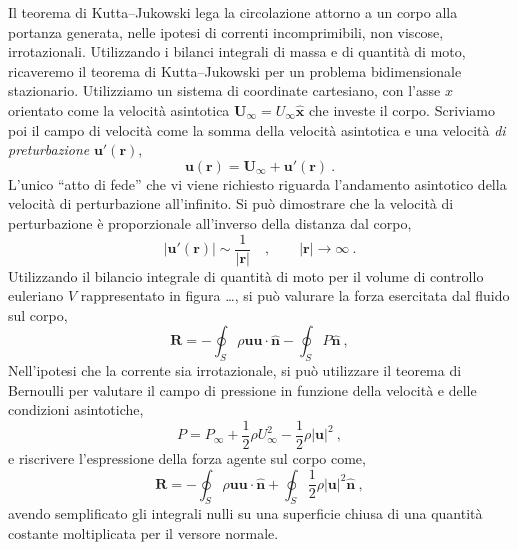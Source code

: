 
Il teorema di Kutta--Jukowski lega la circolazione attorno a un corpo alla portanza generata, nelle ipotesi di correnti incomprimibili, non viscose, irrotazionali.
Utilizzando i bilanci integrali di massa e di quantità di moto, ricaveremo il teorema di Kutta--Jukowski per un problema bidimensionale stazionario.
Utilizziamo un sistema di coordinate cartesiano, con l'asse $x$ orientato come la velocità asintotica $\bm{U}_{\infty} = U_{\infty} \bm{\hat{x}}$ che investe il corpo. Scriviamo poi il campo di velocità come la somma della velocità asintotica e una velocità \textit{di preturbazione} $\bm{u}'(\bm{r})$,
\begin{equation}\label{eqn:vel:dec}
 \bm{u}(\bm{r}) = \bm{U}_{\infty} + \bm{u}'(\bm{r}) \ .
\end{equation}
L'unico ``atto di fede'' che vi viene richiesto riguarda l'andamento asintotico della velocità di perturbazione all'infinito. Si può dimostrare che la velocità di perturbazione è proporzionale all'inverso della distanza dal corpo,
\begin{equation}
 |\bm{u}'(\bm{r})| \sim \dfrac{1}{|\bm{r}|} \quad, \qquad |\bm{r}| \rightarrow \infty \ .
\end{equation}
Utilizzando il bilancio integrale di quantità di moto per il volume di controllo euleriano $V$ rappresentato in figura {\color{red} \dots}, si può valurare la forza esercitata dal fluido sul corpo,
\begin{equation}
 \bm{R} = - \oint_S \rho \bm{u} \bm{u} \cdot \bm{\hat{n}} - \oint_S P \bm{\hat{n}} \ ,
\end{equation}
Nell'ipotesi che la corrente sia irrotazionale, si può utilizzare il teorema di Bernoulli per valutare il campo di pressione in funzione della velocità e delle condizioni asintotiche,
\begin{equation}
 P = P_{\infty} + \dfrac{1}{2} \rho U_{\infty}^2 - \dfrac{1}{2} \rho |\bm{u}|^2 \ ,
\end{equation}
e riscrivere l'espressione della forza agente sul corpo come,
\begin{equation}
 \bm{R} = - \oint_S \rho \bm{u} \bm{u} \cdot \bm{\hat{n}} + \oint_S \dfrac{1}{2} \rho |\bm{u}|^2 \bm{\hat{n}} \ ,
\end{equation}
avendo semplificato gli integrali nulli su una superficie chiusa di una quantità costante moltiplicata per il versore normale.

